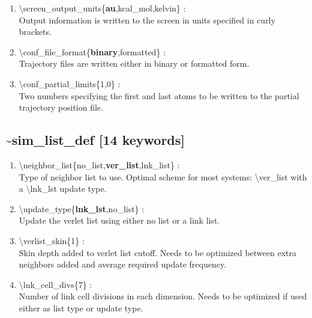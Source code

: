 \documentclass[12pt,titlepage]{article}
\begin{document}
\begin{enumerate}
 \vspace{0.15in} 
 \item   \textbackslash{}screen\_output\_units\{{\bf au},kcal\_mol,kelvin\} : \\
   Output information is written to the screen in units specified 
   in curly brackets.

 \vspace{0.15in} 
 \item   \textbackslash{}conf\_file\_format\{{\bf binary},formatted\} : \\
   Trajectory files are written either in binary or formatted form.

 \vspace{0.15in} 
 \item   \textbackslash{}conf\_partial\_limits\{1,0\} : \\
   Two numbers specifying the first and last atoms to be written to
   the partial trajectory position file.

\end{enumerate}

\newpage
\subsection*{\bf \~{}sim\_list\_def [14 keywords]}

\begin{enumerate}

 \vspace{0.15in} 
 \item   \textbackslash{}neighbor\_list\{no\_list,{\bf ver\_list},lnk\_list\} : \\
   Type of neighbor list to use.  Optimal scheme for most systems: 
   \textbackslash{}ver\_list with a \textbackslash{}lnk\_lst update type.

 \vspace{0.15in} 
 \item   \textbackslash{}update\_type\{{\bf lnk\_lst},no\_list\} : \\
   Update the verlet list using either no list or a link list.

 \vspace{0.15in} 
 \item   \textbackslash{}verlist\_skin\{1\} : \\
   Skin depth added to verlet list cutoff.  Needs to be optimized between
   extra neighbors added and average required update frequency.

 \vspace{0.15in} 
 \item   \textbackslash{}lnk\_cell\_divs\{7\} : \\
   Number of link cell divisions in each dimension.  Needs to be optimized
   if used either as list type or update type.

\end{enumerate}
\end{document}
